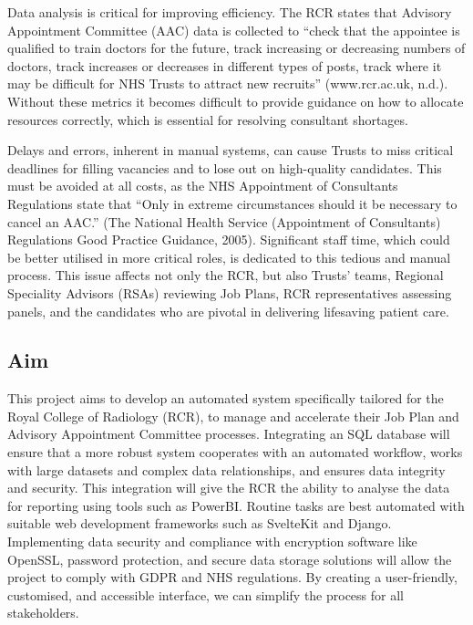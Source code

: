 Data analysis is critical for improving efficiency. The RCR states that Advisory Appointment Committee (AAC) data is collected to “check that the appointee is qualified to train doctors for the future, track increasing or decreasing numbers of doctors, track increases or decreases in different types of posts, track where it may be difficult for NHS Trusts to attract new recruits” (www.rcr.ac.uk, n.d.). Without these metrics it becomes difficult to provide guidance on how to allocate resources correctly, which is essential for resolving consultant shortages.

Delays and errors, inherent in manual systems, can cause Trusts to miss critical deadlines for filling vacancies and to lose out on high-quality candidates. This must be avoided at all costs, as the NHS Appointment of Consultants Regulations state that “Only in extreme circumstances should it be necessary to cancel an AAC.” (The National Health Service (Appointment of Consultants) Regulations Good Practice Guidance, 2005). Significant staff time, which could be better utilised in more critical roles, is dedicated to this tedious and manual process. This issue affects not only the RCR, but also Trusts’ teams, Regional Speciality Advisors (RSAs) reviewing Job Plans, RCR representatives assessing panels, and the candidates who are pivotal in delivering lifesaving patient care.
\subsection{Aim}
This project aims to develop an automated system specifically tailored for the Royal College of Radiology (RCR), to manage and accelerate their Job Plan and Advisory Appointment Committee processes. Integrating an SQL database will ensure that a more robust system cooperates with an automated workflow, works with large datasets and complex data relationships, and ensures data integrity and security. This integration will give the RCR the ability to analyse the data for reporting using tools such as PowerBI. Routine tasks are best automated with suitable web development frameworks such as SvelteKit and Django. Implementing data security and compliance with encryption software like OpenSSL, password protection, and secure data storage solutions will allow the project to comply with GDPR and NHS regulations. By creating a user-friendly, customised, and accessible interface, we can simplify the process for all stakeholders.